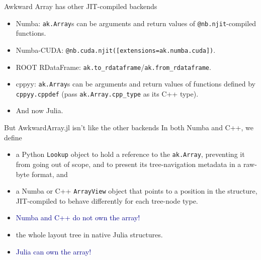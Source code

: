 \documentclass[aspectratio=169]{beamer}
\begin{document}
\begin{frame}{Awkward Array has other JIT-compiled backends}
\vspace{0.5 cm}
\large
\begin{itemize}\setlength{\itemsep}{0.5 cm}
\item<1-> Numba: \texttt{ak.Array}s can be arguments and return values of \texttt{@nb.njit}-compiled functions.
\item<2-> Numba-CUDA: \texttt{@nb.cuda.njit([extensions=ak.numba.cuda])}.
\item<3-> ROOT RDataFrame: \texttt{ak.to_rdataframe}/\texttt{ak.from_rdataframe}.
\item<4-> cppyy: \texttt{ak.Array}s can be arguments and return values of functions defined by \texttt{cppyy.cppdef} (pass \texttt{ak.Array.cpp_type} as its C++ type).
\item<5-> And now Julia.
\end{itemize}
\end{frame}

\begin{frame}{But AwkwardArray.jl isn't like the other backends}
\large
\vspace{0.3 cm}
In both Numba and C++, we define

\vspace{0.25 cm}
\begin{itemize}\setlength{\itemsep}{0.25 cm}
\item<1-> a Python \texttt{Lookup} object to hold a reference to the \texttt{ak.Array}, preventing it from going out of scope, and to present its tree-navigation metadata in a raw-byte format, and
\item<1-> a Numba or C++ \texttt{ArrayView} object that points to a position in the structure, JIT-compiled to behave differently for each tree-node type.
\item<2-> \textcolor{darkblue}{Numba and C++ do not own the array!}
\end{itemize}

\vspace{0.5 cm}

\vspace{0.25 cm}
\begin{itemize}\setlength{\itemsep}{0.25 cm}
\item<3-> the whole layout tree in native Julia structures.
\item<4-> \textcolor{darkblue}{Julia can own the array!}
\end{itemize}
\end{frame}
\end{document}
